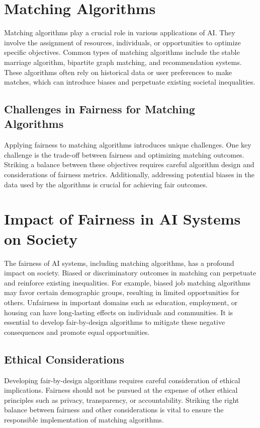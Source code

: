 \documentclass[12pt,a4paper,openright,twoside]{book}
\begin{document}
\section{Matching Algorithms}
Matching algorithms play a crucial role in various applications of AI. They involve the assignment of resources, individuals, or opportunities to optimize specific objectives. Common types of matching algorithms include the stable marriage algorithm, bipartite graph matching, and recommendation systems. These algorithms often rely on historical data or user preferences to make matches, which can introduce biases and perpetuate existing societal inequalities.

\subsection{Challenges in Fairness for Matching Algorithms}
Applying fairness to matching algorithms introduces unique challenges. One key challenge is the trade-off between fairness and optimizing matching outcomes. Striking a balance between these objectives requires careful algorithm design and considerations of fairness metrics. Additionally, addressing potential biases in the data used by the algorithms is crucial for achieving fair outcomes.

\section{Impact of Fairness in AI Systems on Society}
The fairness of AI systems, including matching algorithms, has a profound impact on society. Biased or discriminatory outcomes in matching can perpetuate and reinforce existing inequalities. For example, biased job matching algorithms may favor certain demographic groups, resulting in limited opportunities for others. Unfairness in important domains such as education, employment, or housing can have long-lasting effects on individuals and communities. It is essential to develop fair-by-design algorithms to mitigate these negative consequences and promote equal opportunities.

\subsection{Ethical Considerations}
Developing fair-by-design algorithms requires careful consideration of ethical implications. Fairness should not be pursued at the expense of other ethical principles such as privacy, transparency, or accountability. Striking the right balance between fairness and other considerations is vital to ensure the responsible implementation of matching algorithms.
\end{document}
